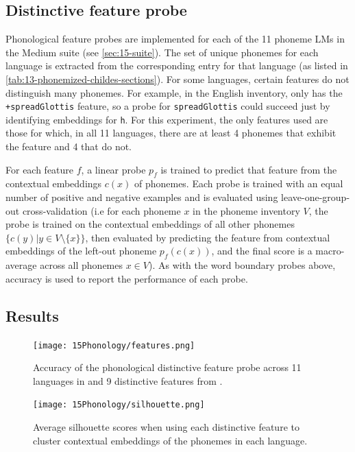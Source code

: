 \subsection{Distinctive feature probe}

Phonological feature probes are implemented for each of the 11 phoneme LMs in the Medium suite (see \cref{sec:15-suite}). The set of unique phonemes for each language is extracted from the corresponding \phoible entry for that language (as listed in \cref{tab:13-phonemized-childes-sections}). For some languages, certain features do not distinguish many phonemes. For example, in the English \phoible inventory, only  has the \texttt{+spreadGlottis} feature, so a probe for \texttt{spreadGlottis} could succeed just by identifying embeddings for \texttt{h}. For this experiment, the only features used are those for which, in all 11 languages, there are at least 4 phonemes that exhibit the feature and 4 that do not. 

For each feature $f$, a linear probe $p_f$ is trained to predict that feature from the contextual embeddings $c(x)$ of phonemes. Each probe is trained with an equal number of positive and negative examples and is evaluated using leave-one-group-out cross-validation (i.e for each phoneme $x$ in the phoneme inventory $V$, the probe is trained on the contextual embeddings of all other phonemes $\{c(y) | y\in V \setminus \{x\}\}$, then evaluated by predicting the feature from contextual embeddings of the left-out phoneme $p_f(c(x))$, and the final score is a macro-average across all phonemes $x\in V$). As with the word boundary probes above, accuracy is used to report the performance of each probe.

\subsection{Results}

\begin{figure}[t]
    \centering
    \texttt{[image: 15Phonology/features.png]}
    \caption{Accuracy of the phonological distinctive feature probe across 11 languages in \ipachildes and 9 distinctive features from \phoible.}
    \label{fig:features}
\end{figure}

\begin{figure}[t]
    \centering
    \texttt{[image: 15Phonology/silhouette.png]}
    \caption{Average silhouette scores when using each distinctive feature to cluster contextual embeddings of the phonemes in each language.}
    \label{fig:silhouette}
\end{figure}

